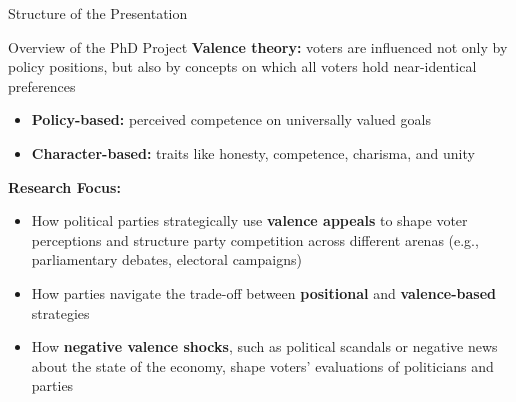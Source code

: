 \documentclass[9pt, aspectratio=169]{beamer}
\newcommand{\customcites}[1]{\textcolor{blue}{\footnotesize\parencites{#1}}}
\begin{document}
\begin{section}{Structure of the Presentation}
\begin{frame}{Overview of the PhD Project}
    \textbf{Valence theory:} voters are influenced not only by policy positions, but also by concepts on which all voters hold near-identical preferences \customcites{stokes1992valence, clark2009valence} \vspace{0.2cm}
        \begin{itemize}
            \item \textbf{Policy-based:} perceived competence on universally valued goals \customcites{groseclose2001model, jacoby2009public, clark2009valence} \vspace{0.2cm}
            \item \textbf{Character-based:} traits like honesty, competence, charisma, and unity \customcites{clark2009valence, adams2001theory}
        \end{itemize}
\vspace{0.3cm}
\textbf{Research Focus:} \vspace{0.1cm}
\begin{itemize}
    \item How political parties strategically use \textbf{valence appeals} to shape voter perceptions and structure party competition across different arenas (e.g., parliamentary debates, electoral campaigns) \vspace{0.2cm}
    \item How parties navigate the trade-off between \textbf{positional} and \textbf{valence-based} strategies \vspace{0.2cm}
    \item How \textbf{negative valence shocks}, such as political scandals or negative news about the state of the economy, shape voters’ evaluations of politicians and parties
\end{itemize}
\end{frame}


\end{section}
\end{document}
